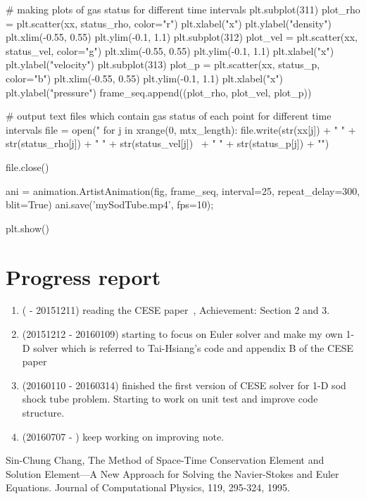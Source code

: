 \documentclass[a4paper,12pt,dvips]{article}
\begin{document}
\begin{pythonWithIndex}
        # making plots of gas status for different time intervals
        plt.subplot(311)
        plot_rho = plt.scatter(xx, status_rho, color="r")
        plt.xlabel("x")
        plt.ylabel("density")
        plt.xlim(-0.55, 0.55)
        plt.ylim(-0.1, 1.1)
        plt.subplot(312)
        plot_vel = plt.scatter(xx, status_vel, color="g")
        plt.xlim(-0.55, 0.55)
        plt.ylim(-0.1, 1.1)
        plt.xlabel("x")
        plt.ylabel("velocity")
        plt.subplot(313)
        plot_p = plt.scatter(xx, status_p, color="b")
        plt.xlim(-0.55, 0.55)
        plt.ylim(-0.1, 1.1)
        plt.xlabel("x")
        plt.ylabel("pressure")
        frame_seq.append((plot_rho, plot_vel, plot_p))

    # output text files which contain gas status of each point for different time intervals
    file = open("%
    for j in xrange(0, mtx_length):
        file.write(str(xx[j]) + " " + str(status_rho[j]) + " " + str(status_vel[j]) \
                                                   + " " + str(status_p[j]) + "\n")

    file.close()

ani = animation.ArtistAnimation(fig, frame_seq, interval=25, repeat_delay=300, blit=True)
ani.save('mySodTube.mp4', fps=10);

plt.show()
\end{pythonWithIndex}

\section{Progress report}
 \label{sec:progress_report}
 \begin{enumerate}
  \item ( - 20151211) reading the CESE paper~\cite{CESE_Shin_Chung_Chang_1995},
        Achievement: Section 2 and 3.
  \item (20151212 - 20160109) starting to focus on Euler solver and make my own
        1-D solver which is referred to Tai-Hsiang's code and appendix B of the
        CESE paper~\cite{CESE_Shin_Chung_Chang_1995}
  \item (20160110 - 20160314) finished the first version of CESE solver for 1-D
        sod shock tube problem. Starting to work on unit test and improve code
        structure.
  \item (20160707 - ) keep working on improving note.
 \end{enumerate}



\begin{thebibliography}{99}
 Sin-Chung Chang, The Method of Space-Time
         Conservation Element and Solution Element—A New Approach for Solving
         the Navier-Stokes and Euler Equations. Journal of Computational
         Physics, 119, 295-324, 1995.
\end{thebibliography}
\end{document}
